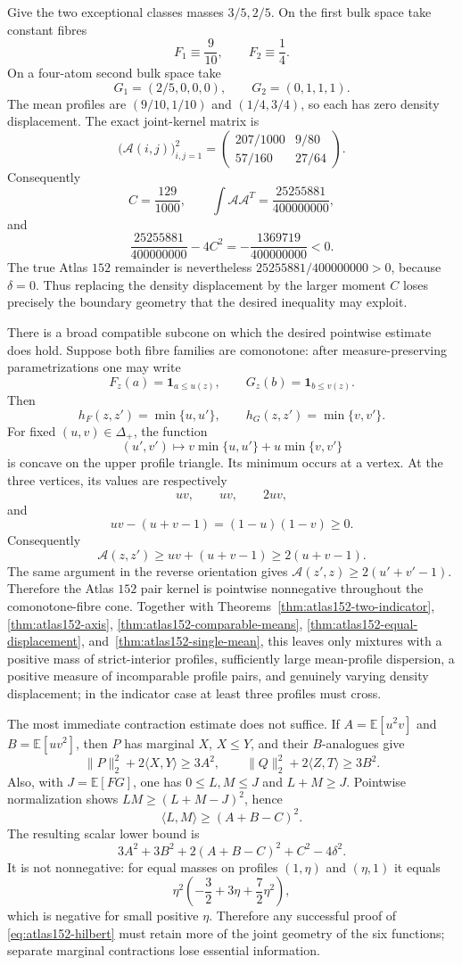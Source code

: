 \documentclass[11pt]{article}
\begin{document}
Give the two exceptional classes masses $3/5,2/5$.  On the first bulk
space take constant fibres
\[
 F_1\equiv\frac9{10},\qquad F_2\equiv\frac14.
\]
On a four-atom second bulk space take
\[
 G_1=(2/5,0,0,0),\qquad G_2=(0,1,1,1).
\]
The mean profiles are $(9/10,1/10)$ and $(1/4,3/4)$, so each has zero
density displacement.  The exact joint-kernel matrix is
\[
 \bigl(\mathcal A(i,j)\bigr)_{i,j=1}^2
 =
 \begin{pmatrix}
 207/1000&9/80\\
 57/160&27/64
 \end{pmatrix}.
\]
Consequently
\[
 C=\frac{129}{1000},\qquad
 \int\mathcal A\mathcal A^T=\frac{25255881}{400000000},
\]
and
\[
 \frac{25255881}{400000000}-4C^2
 =-\frac{1369719}{400000000}<0.
\]
The true Atlas $152$ remainder is nevertheless
$25255881/400000000>0$, because $\delta=0$.  Thus replacing the density
displacement by the larger moment $C$ loses precisely the boundary geometry
that the desired inequality may exploit.

There is a broad compatible subcone on which the desired pointwise estimate
does hold.  Suppose both fibre families are comonotone: after
measure-preserving parametrizations one may write
\[
 F_z(a)=\mathbf1_{a\leq u(z)},
 \qquad
 G_z(b)=\mathbf1_{b\leq v(z)}.
\]
Then
\[
 h_F(z,z')=\min\{u,u'\},\qquad
 h_G(z,z')=\min\{v,v'\}.
\]
For fixed $(u,v)\in\Delta_+$, the function
\[
 (u',v')\longmapsto
 v\min\{u,u'\}+u\min\{v,v'\}
\]
is concave on the upper profile triangle.  Its minimum occurs at a vertex.
At the three vertices, its values are respectively
\[
 uv,\qquad uv,\qquad 2uv,
\]
and
\[
 uv-(u+v-1)=(1-u)(1-v)\geq0.
\]
Consequently
\[
 \mathcal A(z,z')
 \geq uv+(u+v-1)\geq2(u+v-1).
\]
The same argument in the reverse orientation gives
$\mathcal A(z',z)\geq2(u'+v'-1)$.  Therefore the Atlas $152$ pair kernel is
pointwise nonnegative throughout the comonotone-fibre cone.  Together with
Theorems~\ref{thm:atlas152-two-indicator}, \ref{thm:atlas152-axis},
\ref{thm:atlas152-comparable-means},
\ref{thm:atlas152-equal-displacement}, and~\ref{thm:atlas152-single-mean},
this leaves only mixtures with a positive mass of strict-interior profiles,
sufficiently large mean-profile dispersion, a positive measure of
incomparable profile pairs, and genuinely varying density displacement; in
the indicator case at least three profiles must cross.

The most immediate contraction estimate does not suffice.  If
$A=\mathbb E[u^2v]$ and $B=\mathbb E[uv^2]$, then $P$ has marginal $X$,
$X\leq Y$, and their $B$-analogues give
\[
 \|P\|_2^2+2\langle X,Y\rangle\geq3A^2,
 \qquad
 \|Q\|_2^2+2\langle Z,T\rangle\geq3B^2.
\]
Also, with $J=\mathbb E[FG]$, one has $0\leq L,M\leq J$ and
$L+M\geq J$.  Pointwise normalization shows
$LM\geq(L+M-J)^2$, hence
\[
 \langle L,M\rangle\geq(A+B-C)^2.
\]
The resulting scalar lower bound is
\[
 3A^2+3B^2+2(A+B-C)^2+C^2-4\delta^2.
\]
It is not nonnegative: for equal masses on profiles
$(1,\eta)$ and $(\eta,1)$ it equals
\[
 \eta^2\left(-\frac32+3\eta+\frac72\eta^2\right),
\]
which is negative for small positive $\eta$.  Therefore any successful proof
of \eqref{eq:atlas152-hilbert} must retain more of the joint geometry of the
six functions; separate marginal contractions lose essential information.
\end{document}
